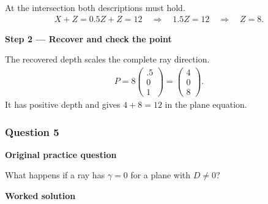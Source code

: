 \documentclass[letterpaper,11pt,english,openany,oneside]{jupyterBook}
\begin{document}
\sphinxAtStartPar
{} At the intersection both descriptions must hold.
{\color{QuizMathBlue} \begin{equation*}
\begin{split}
X+Z=0.5Z+Z=12\quad\Rightarrow\quad1.5Z=12\quad\Rightarrow\quad Z=8.
\end{split}
\end{equation*}}
\par

\par\medskip{}
{\color{QuizStepRed}\bfseries Step 2 — Recover and check the point}\par\smallskip

\sphinxAtStartPar
{} The recovered depth scales the complete ray direction.
{\color{QuizMathBlue} \begin{equation*}
\begin{split}
P=8\begin{pmatrix}.5\\0\\1\end{pmatrix}=\begin{pmatrix}4\\0\\8\end{pmatrix}.
\end{split}
\end{equation*}}
\sphinxAtStartPar
It has positive depth and gives {\color{QuizMathBlue} \(4+8=12\)} in the plane equation.

\par

\par\medskip


\subsubsection{Question 5}
\label{\detokenize{lectures/lecture03/tldr:question-5}}\label{\detokenize{lectures/lecture03/tldr:lec03-tldr-q5}}
\par\medskip\textbf{Original practice question}\par\smallskip

\sphinxAtStartPar
What happens if a ray has \(\gamma=0\) for a plane with \(D\ne0\)?

\par\medskip

\par\medskip
\textbf{Worked solution}\par\smallskip
\end{document}
